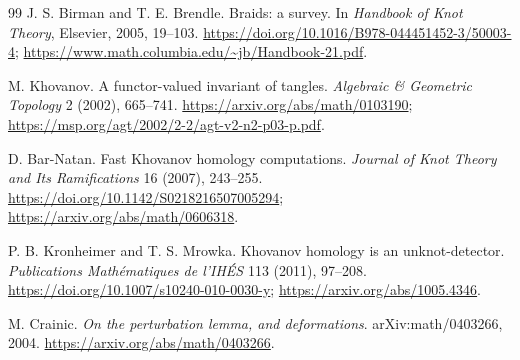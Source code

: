 \documentclass[11pt,letterpaper]{article}
\theoremstyle{definition}
\begin{document}
\begin{thebibliography}{99}
J. S. Birman and T. E. Brendle.
Braids: a survey. In \emph{Handbook of Knot Theory},
Elsevier, 2005, 19--103.
\url{https://doi.org/10.1016/B978-044451452-3/50003-4};
\url{https://www.math.columbia.edu/~jb/Handbook-21.pdf}.

M. Khovanov.
A functor-valued invariant of tangles.
\emph{Algebraic \& Geometric Topology} 2 (2002), 665--741.
\url{https://arxiv.org/abs/math/0103190};
\url{https://msp.org/agt/2002/2-2/agt-v2-n2-p03-p.pdf}.

D. Bar-Natan.
Fast Khovanov homology computations.
\emph{Journal of Knot Theory and Its Ramifications} 16 (2007), 243--255.
\url{https://doi.org/10.1142/S0218216507005294};
\url{https://arxiv.org/abs/math/0606318}.

P. B. Kronheimer and T. S. Mrowka.
Khovanov homology is an unknot-detector.
\emph{Publications Math\'ematiques de l'IH\'ES} 113 (2011), 97--208.
\url{https://doi.org/10.1007/s10240-010-0030-y};
\url{https://arxiv.org/abs/1005.4346}.

M. Crainic.
\emph{On the perturbation lemma, and deformations}.
arXiv:math/0403266, 2004.
\url{https://arxiv.org/abs/math/0403266}.
\end{thebibliography}
\end{document}
